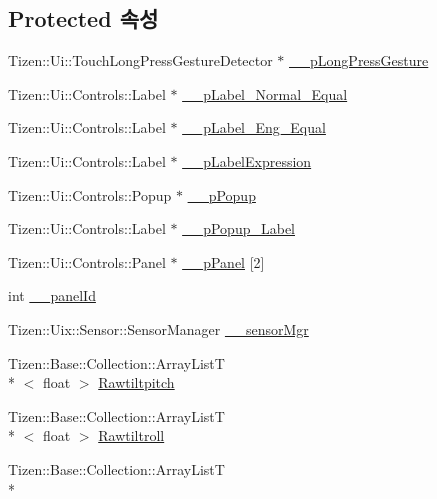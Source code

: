 \subsection*{Protected 속성}
\begin{DoxyCompactItemize}
\item 
Tizen\+::\+Ui\+::\+Touch\+Long\+Press\+Gesture\+Detector $\ast$ \hyperlink{class_calculator_form_ae2c4d24712fa767d536ffc901810bff3}{\+\_\+\+\_\+p\+Long\+Press\+Gesture}
\item 
Tizen\+::\+Ui\+::\+Controls\+::\+Label $\ast$ \hyperlink{class_calculator_form_ae9a8c51bc39c7ec66a7e43f6c29a14d8}{\+\_\+\+\_\+p\+Label\+\_\+\+Normal\+\_\+\+Equal}
\item 
Tizen\+::\+Ui\+::\+Controls\+::\+Label $\ast$ \hyperlink{class_calculator_form_a57055baa16d93e319c193d01bf833bc7}{\+\_\+\+\_\+p\+Label\+\_\+\+Eng\+\_\+\+Equal}
\item 
Tizen\+::\+Ui\+::\+Controls\+::\+Label $\ast$ \hyperlink{class_calculator_form_a85c791f34a8b69e7d22b7d64d7f69bac}{\+\_\+\+\_\+p\+Label\+Expression}
\item 
Tizen\+::\+Ui\+::\+Controls\+::\+Popup $\ast$ \hyperlink{class_calculator_form_aa22a98e80f0533746ca5c712ea3b7a8e}{\+\_\+\+\_\+p\+Popup}
\item 
Tizen\+::\+Ui\+::\+Controls\+::\+Label $\ast$ \hyperlink{class_calculator_form_aabf0dd69d2567ee96db776f4bbe53f4e}{\+\_\+\+\_\+p\+Popup\+\_\+\+Label}
\item 
Tizen\+::\+Ui\+::\+Controls\+::\+Panel $\ast$ \hyperlink{class_calculator_form_ae930aeea4ccaf0fd752c11350c6e2af6}{\+\_\+\+\_\+p\+Panel} \mbox{[}2\mbox{]}
\item 
int \hyperlink{class_calculator_form_a4b8ee8d07acfddbe9140a17a37b23109}{\+\_\+\+\_\+panel\+Id}
\item 
Tizen\+::\+Uix\+::\+Sensor\+::\+Sensor\+Manager \hyperlink{class_calculator_form_abb49d4c96119ee3adaf6a9bf8302ddaa}{\+\_\+\+\_\+sensor\+Mgr}
\item 
Tizen\+::\+Base\+::\+Collection\+::\+Array\+List\+T\\*
$<$ float $>$ \hyperlink{class_calculator_form_a7b784d40a3d83eee41bb8efae09142ca}{Rawtiltpitch}
\item 
Tizen\+::\+Base\+::\+Collection\+::\+Array\+List\+T\\*
$<$ float $>$ \hyperlink{class_calculator_form_afc8797d0cb7657a384ccc03c7f335aed}{Rawtiltroll}
\item 
Tizen\+::\+Base\+::\+Collection\+::\+Array\+List\+T\\*

\end{DoxyCompactItemize}
